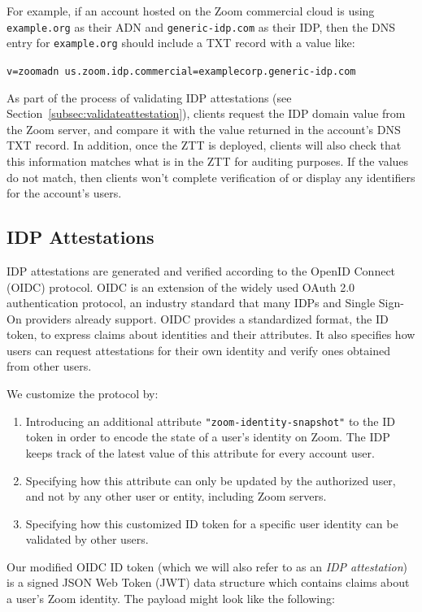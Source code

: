 For example, if an account hosted on the Zoom commercial cloud is using \texttt{example.org} as
their ADN and \texttt{generic-idp.com} as their IDP, then the DNS entry for \texttt{example.org}
should include a TXT record with a value like:
\begin{center}
    \texttt{v=zoomadn us.zoom.idp.commercial=examplecorp.generic-idp.com}
\end{center}


As part of the process of validating IDP attestations (see
Section~\ref{subsec:validateattestation}), clients request the IDP domain value from the Zoom
server, and compare it with the value returned in the account's DNS TXT record. In addition, once
the ZTT is deployed, clients will also check that this information matches what is in the ZTT for
auditing purposes. If the values do not match, then clients won't complete verification of or
display any identifiers for the account's users.

\subsection{IDP Attestations}

IDP attestations are generated and verified according to the OpenID Connect (OIDC) protocol. OIDC is
an extension of the widely used OAuth 2.0 authentication protocol, an industry standard that many
IDPs and Single Sign-On providers already support. OIDC provides a standardized format, the ID
token, to express claims about identities and their attributes. It also specifies how users can
request attestations for their own identity and verify ones obtained from other users.

We customize the protocol by:

\begin{enumerate}
\item Introducing an additional attribute \texttt{"zoom-identity-snapshot"} to the ID token in order
    to encode the state of a user's identity on Zoom. The IDP keeps track of the latest value of
    this attribute for every account user.
\item Specifying how this attribute can only be updated by the authorized user, and not by any other
    user or entity, including Zoom servers.
\item Specifying how this customized ID token for a specific user identity can be validated by other
    users.
\end{enumerate}

Our modified OIDC ID token (which we will also refer to as an \textit{IDP attestation}) is a signed
JSON Web Token (JWT) data structure which contains claims about a user’s Zoom identity. The payload
might look like the following:

